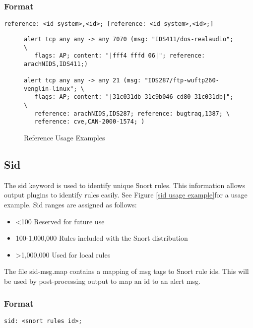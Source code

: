 \documentclass[english]{report}
\begin{document}
\subsubsection{Format}

\begin{verbatim}
reference: <id system>,<id>; [reference: <id system>,<id>;]
\end{verbatim}

%
\begin{figure}[!hbpt]
\begin{verbatim}
alert tcp any any -> any 7070 (msg: "IDS411/dos-realaudio"; \
   flags: AP; content: "|fff4 fffd 06|"; reference: arachNIDS,IDS411;)

alert tcp any any -> any 21 (msg: "IDS287/ftp-wuftp260-venglin-linux"; \
   flags: AP; content: "|31c031db 31c9b046 cd80 31c031db|"; \
   reference: arachNIDS,IDS287; reference: bugtraq,1387; \
   reference: cve,CAN-2000-1574; )

\end{verbatim}

\caption{Reference Usage Examples\label{example reference rule}}
\end{figure}

\subsection{Sid\label{sid label}}

The sid keyword is used to identify unique Snort rules. This information
allows output plugins to identify rules easily. See Figure \ref{sid usage example}for
a usage example. Sid ranges are assigned as follows:

\begin{itemize}
\item <100 Reserved for future use
\item 100-1,000,000 Rules included with the Snort distribution
\item >1,000,000 Used for local rules
\end{itemize}
The file sid-msg.map contains a mapping of msg tags to Snort rule
ids. This will be used by post-processing output to map an id to an
alert msg.


\subsubsection{Format}

\begin{verbatim}
sid: <snort rules id>;
\end{verbatim}
\end{document}

